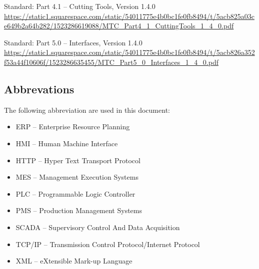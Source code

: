 \hang [MT Part 4.1]	\mtconnect Standard: Part 4.1 -- Cutting Tools, Version 1.4.0 \\
\url{https://static1.squarespace.com/static/54011775e4b0bc1fe0fb8494/t/5acb825a03ce649b2a64b282/1523286619088/MTC_Part4_1_CuttingTools_1_4_0.pdf}

\hang [MT Part 5.0]	\mtconnect Standard: Part 5.0 -- Interfaces, Version 1.4.0 \\
\url{https://static1.squarespace.com/static/54011775e4b0bc1fe0fb8494/t/5acb826a352f53a44f10606f/1523286635455/MTC_Part5_0_Interfaces_1_4_0.pdf}

\subsection{Abbrevations}

The following abbreviation are used in this document:

\begin{itemize}
    \item ERP -- Enterprise Resource Planning
    \item HMI -- Human Machine Interface
    \item HTTP -- Hyper Text Transport Protocol
    \item MES -- Management Execution Systems
    \item PLC -- Programmable Logic Controller
    \item PMS -- Production Management Systems
    \item SCADA -- Supervisory Control And Data Acquisition
    \item TCP/IP -- Transmission Control Protocol/Internet Protocol
    \item XML -- eXtensible Mark-up Language
\end{itemize}

